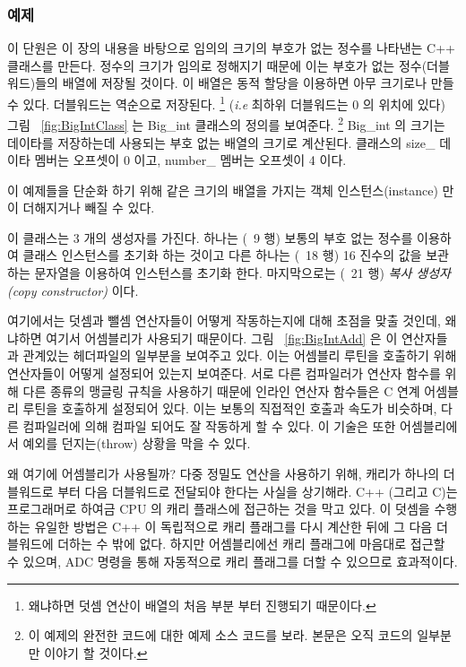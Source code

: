 \subsubsection{예제}
이 단원은 이 장의 내용을 바탕으로 임의의 크기의 부호가 없는 정수를
나타낸는 C++ 클래스를 만든다. 정수의 크기가 임의로 정해지기 때문에 이는
부호가 없는 정수(더블워드)들의 배열에 저장될 것이다. 이 배열은 동적 할당을
이용하면 아무 크기로나 만들 수 있다. 더블워드는 역순으로 저장된다.
\footnote{왜냐하면 덧셈 연산이 배열의 처음 부분 부터 진행되기 
때문이다.} (\emph{i.e} 최하위 더블워드는 0 의 위치에 있다) 그림 ~\ref{fig:BigIntClass} 는
{\code Big\_int} 클래스의 정의를 보여준다. 
\footnote{이 예제의 완전한 코드에 대한 예제 소스 코드를 보라. 본문은 오직
코드의 일부분만 이야기 할 것이다. } {\code Big\_int} 의 크기는 데이타를 저장하는데 사용되는 
부호 없는 배열의 크기로 계산된다. 클래스의 {\code size\_} 데이타 멤버는 오프셋이 0 이고,
{\code number\_} 멤버는 오프셋이 4 이다. 

이 예제들을 단순화 하기 위해 같은 크기의 배열을 가지는 객체 인스턴스(instance) 만이 
더해지거나 빼질 수 있다. 

이 클래스는 3 개의 생성자를 가진다. 하나는 (~9 행) 보통의 부호 없는 정수를 이용하여
클래스 인스턴스를 초기화 하는 것이고 다른 하나는 (~18 행) 16 진수의 값을 보관하는 문자열을 이용하여
인스턴스를 초기화 한다. 마지막으로는 (~21 행) \emph{복사 생성자(copy constructor)} 
이다. 

여기에서는 덧셈과 뺄셈 연산자들이 어떻게 작동하는지에 대해 초점을 맞출 것인데,
왜냐하면 여기서 어셈블리가 사용되기 때문이다. 그림 ~\ref{fig:BigIntAdd} 은 
이 연산자들과 관계있는 헤더파일의 일부분을 보여주고 있다. 이는 어셈블리 루틴을
호출하기 위해 연산자들이 어떻게 설정되어 있는지 보여준다. 서로 다른 컴파일러가 
연산자 함수를 위해 다른 종류의 맹글링 규칙을 사용하기 때문에 인라인 연산자 함수들은
C 연계 어셈블리 루틴을 호출하게 설정되어 있다. 이는 보통의 직접적인 호출과 속도가
비슷하며, 다른 컴파일러에 의해 컴파일 되어도 잘 작동하게 할 수 있다. 이 기술은 또한
어셈블리에서 예외를 던지는(throw) 상황을 막을 수 있다. 

왜 여기에 어셈블리가 사용될까? 다중 정밀도 연산을 사용하기 위해, 캐리가 하나의
더블워드로 부터 다음 더블워드로 전달되야 한다는 사실을 상기해라. C++ (그리고 C)는
프로그래머로 하여금 CPU 의 캐리 플래스에 접근하는 것을 막고 있다. 이 덧셈을 수행하는
유일한 방법은 C++ 이 독립적으로 캐리 플래그를 다시 계산한 뒤에 그 다음 더블워드에
더하는 수 밖에 없다. 하지만 어셈블리에선 캐리 플래그에 마음대로 접근할 수 있으며,
{\code ADC} 명령을 통해 자동적으로 캐리 플래그를 더할 수 있으므로 효과적이다. 

